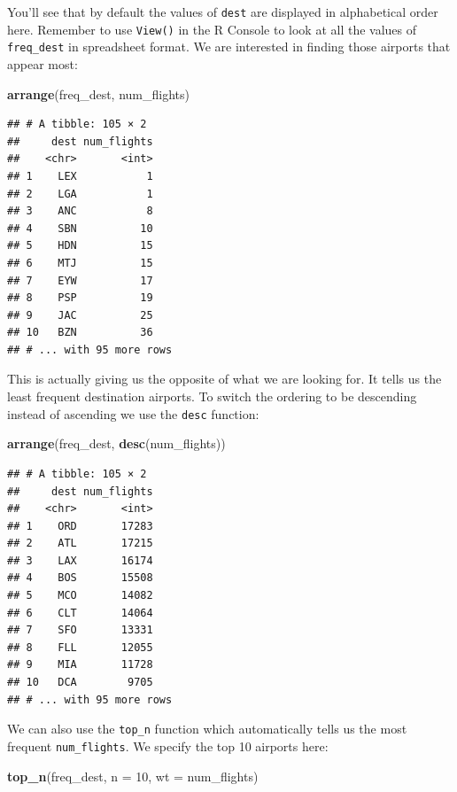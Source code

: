 \documentclass[]{tufte-book}
\newenvironment{Shaded}{\begin{snugshade}}{\end{snugshade}}
\newcommand{\KeywordTok}[1]{\textcolor[rgb]{0.13,0.29,0.53}{\textbf{{#1}}}}
\newcommand{\DataTypeTok}[1]{\textcolor[rgb]{0.13,0.29,0.53}{{#1}}}
\newcommand{\DecValTok}[1]{\textcolor[rgb]{0.00,0.00,0.81}{{#1}}}
\newcommand{\NormalTok}[1]{{#1}}
\begin{document}
You'll see that by default the values of \texttt{dest} are displayed in
alphabetical order here. Remember to use \texttt{View()} in the R
Console to look at all the values of \texttt{freq\_dest} in spreadsheet
format. We are interested in finding those airports that appear most:

\begin{Shaded}
\begin{Highlighting}[]
\KeywordTok{arrange}\NormalTok{(freq_dest, num_flights)}
\end{Highlighting}
\end{Shaded}

\begin{verbatim}
## # A tibble: 105 × 2
##     dest num_flights
##    <chr>       <int>
## 1    LEX           1
## 2    LGA           1
## 3    ANC           8
## 4    SBN          10
## 5    HDN          15
## 6    MTJ          15
## 7    EYW          17
## 8    PSP          19
## 9    JAC          25
## 10   BZN          36
## # ... with 95 more rows
\end{verbatim}

This is actually giving us the opposite of what we are looking for. It
tells us the least frequent destination airports. To switch the ordering
to be descending instead of ascending we use the \texttt{desc} function:

\begin{Shaded}
\begin{Highlighting}[]
\KeywordTok{arrange}\NormalTok{(freq_dest, }\KeywordTok{desc}\NormalTok{(num_flights))}
\end{Highlighting}
\end{Shaded}

\begin{verbatim}
## # A tibble: 105 × 2
##     dest num_flights
##    <chr>       <int>
## 1    ORD       17283
## 2    ATL       17215
## 3    LAX       16174
## 4    BOS       15508
## 5    MCO       14082
## 6    CLT       14064
## 7    SFO       13331
## 8    FLL       12055
## 9    MIA       11728
## 10   DCA        9705
## # ... with 95 more rows
\end{verbatim}

We can also use the \texttt{top\_n} function which automatically tells
us the most frequent \texttt{num\_flights}. We specify the top 10
airports here:

\begin{Shaded}
\begin{Highlighting}[]
\KeywordTok{top_n}\NormalTok{(freq_dest, }\DataTypeTok{n =} \DecValTok{10}\NormalTok{, }\DataTypeTok{wt =} \NormalTok{num_flights)}
\end{Highlighting}
\end{Shaded}
\end{document}
